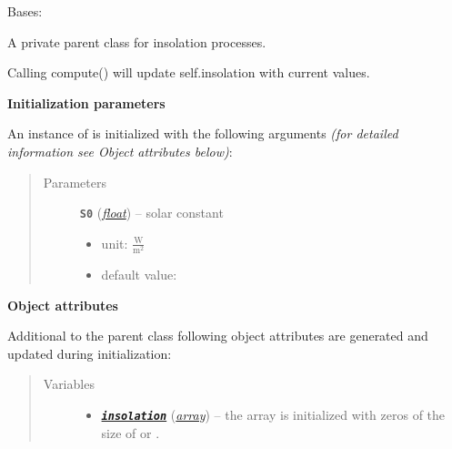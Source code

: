 \documentclass[letterpaper,10pt,english]{sphinxmanual}
\begin{document}
\begin{fulllineitems}
\label{api/climlab.radiation:climlab.radiation.insolation._Insolation}
Bases: {\hyperref[api/climlab.process:climlab.process.diagnostic.DiagnosticProcess]{\emph{}}}

A private parent class for insolation processes.

Calling compute() will update self.insolation with current values.

\textbf{Initialization parameters}

An instance of  is initialized with the following 
arguments \emph{(for detailed information see Object attributes below)}:
\begin{quote}\begin{description}
\item[{Parameters}] \leavevmode
\textbf{\texttt{S0}} (\href{http://docs.python.org/2.7/library/functions.html\#float}{\emph{float}}) -- 
solar constant
\begin{itemize}
\item {} 
unit: \(\frac{\textrm{W}}{\textrm{m}^2}\)

\item {} 
default value: 

\end{itemize}


\end{description}\end{quote}

\textbf{Object attributes}

Additional to the parent class {\hyperref[api/climlab.process:climlab.process.diagnostic.DiagnosticProcess]{\emph{}}}
following object attributes are generated and updated during initialization:
\begin{quote}\begin{description}
\item[{Variables}] \leavevmode\begin{itemize}
\item {} 
{\hyperref[api/climlab.radiation:module-climlab.radiation.insolation]{\emph{\textbf{\texttt{insolation}}}}} (\href{http://docs.python.org/2.7/library/array.html\#module-array}{\emph{array}}) -- the array is initialized with zeros of the size of
 or .


\end{itemize}
\end{description}
\end{quote}
\end{fulllineitems}
\end{document}
